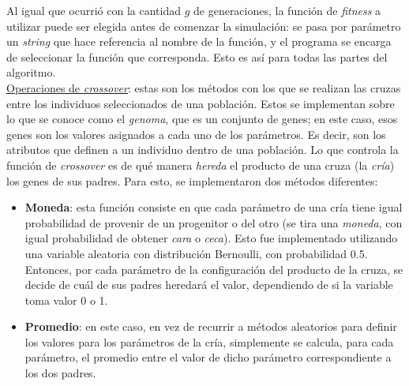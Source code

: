 \documentclass[12pt,a4paper]{article}
\begin{document}
    Al igual que ocurrió con la cantidad $g$ de generaciones, la función de \textit{fitness} a utilizar puede ser elegida antes de comenzar la simulación: se pasa por parámetro un \textit{string} que hace referencia al nombre de la función, y el programa se encarga de seleccionar la función que corresponda. Esto es así para todas las partes del algoritmo. \\[4pt]
    
    \underline{Operaciones de \textit{crossover}}: estas son los métodos con los que se realizan las cruzas entre los individuos seleccionados de una población. Estos se implementan sobre lo que se conoce como el \textit{genoma}, que es un conjunto de genes; en este caso, esos genes son los valores asignados a cada uno de los parámetros. Es decir, son los atributos que definen a un individuo dentro de una población. Lo que controla la función de \textit{crossover} es de qué manera \textit{hereda} el producto de una cruza (la \textit{cría}) los genes de sus padres. Para esto, se implementaron dos métodos diferentes:
        \begin{itemize}
            \item \textbf{Moneda}: esta función consiste en que cada parámetro de una cría tiene igual probabilidad de provenir de un progenitor o del otro (se tira una \textit{moneda}, con igual probabilidad de obtener \textit{cara} o \textit{ceca}). Esto fue implementado utilizando una variable aleatoria con distribución Bernoulli, con probabilidad 0.5. Entonces, por cada parámetro de la configuración del producto de la cruza, se decide de cuál de sus padres heredará el valor, dependiendo de si la variable toma valor 0 o 1.
            \item \textbf{Promedio}: en este caso, en vez de recurrir a métodos aleatorios para definir los valores para los parámetros de la cría, simplemente se calcula, para cada parámetro, el promedio entre el valor de dicho parámetro correspondiente a los dos padres.
        \end{itemize}
        
\end{document}
